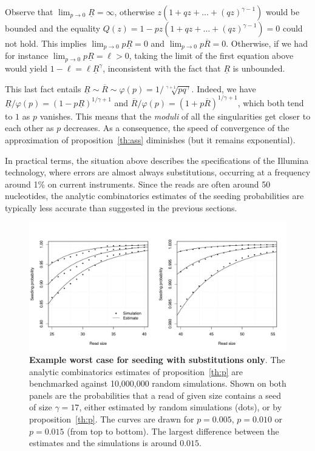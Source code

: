 \documentclass{article}
\begin{document}
Observe that $\lim_{p\rightarrow 0}\underline{R} = \infty$, otherwise
$z(1+qz+\ldots+(qz)^{\gamma-1})$ would be bounded and the equality $Q(z) =
1-pz(1+qz+\ldots+(qz)^{\gamma-1}) = 0$ could not hold. This implies
$\lim_{p\rightarrow 0}p\underline{R} = 0$ and $\lim_{p\rightarrow
0}p\overline{R} = 0$. Otherwise, if we had for instance
$\lim_{p\rightarrow 0}p\underline{R} = \ell > 0$, taking the limit of the
first equation above would yield $1-\ell = \ell \underline{R}^\gamma$,
inconsistent with the fact that $\underline{R}$ is unbounded.

This last fact entails $\underline{R} \sim \overline{R} \sim \varphi(p) =
1/ \sqrt[\gamma+1]{pq^\gamma}$. Indeed, we have $\underline{R}/\varphi(p)
= (1-p\underline{R})^{1/\gamma+1}$ and $\overline{R}/\varphi(p) =
(1+p\overline{R})^{1/\gamma+1}$, which both tend to $1$ as $p$ vanishes.
This means that the \textit{moduli} of all the singularities get closer to
each other as $p$ decreases. As a consequence, the speed of convergence of
the approximation of proposition~\ref{th:ass} diminishes (but it remains
exponential).

In practical terms, the situation above describes the specifications of
the Illumina technology, where errors are almost always substitutions,
occurring at a frequency around 1\% on current instruments. Since the
reads are often around 50 nucleotides, the analytic combinatorics
estimates of the seeding probabilities are typically less accurate than
suggested in the previous sections.


\begin{figure}[h]
\centering
\includegraphics[scale=0.445]{simulp_short.pdf}
\caption{\textbf{Example worst case for seeding with substitutions only}.
The analytic combinatorics estimates of proposition~\ref{th:p} are
benchmarked against 10,000,000 random simulations. Shown on both panels
are the probabilities that a read of given size contains a seed of size
$\gamma=17$, either estimated by random simulations (dots), or by
proposition~\ref{th:p}. The curves are drawn for $p=0.005$, $p=0.010$ or
$p=0.015$ (from top to bottom). The largest difference between the
estimates and the simulations is around $0.015$.}
\label{fig:illumina}
\end{figure}
\end{document}
